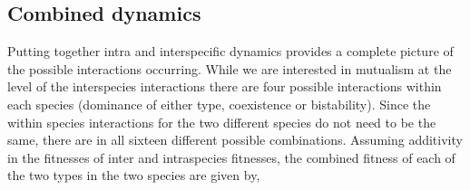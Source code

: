 \documentclass[12pt]{article}
\begin{document}
\subsection{Combined dynamics}

Putting together intra and interspecific dynamics provides a complete picture of the possible interactions occurring. While we are interested in mutualism at the level of the interspecies interactions there are four possible interactions within each species \citep{nowak:Science:2004,hauert:JTB:2006a} (dominance of either type, coexistence or bistability). Since the within species interactions for the two different species do not need to be the same, there are in all sixteen different possible combinations.
Assuming additivity in the fitnesses of inter and intraspecies fitnesses, the combined fitness of each of the two types in the two species are given by,
\end{document}
